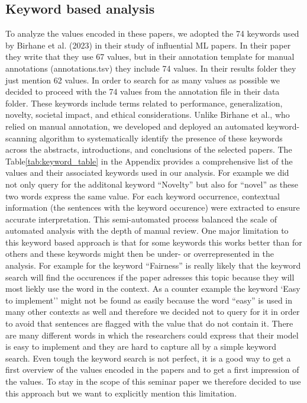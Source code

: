 \documentclass{article}
\begin{document}
\subsection{Keyword based analysis}
To analyze the values encoded in these papers, we adopted the 74 keywords used by Birhane et al. (2023) in their study of influential ML papers. In their paper
they write that they use 67 values, but in their annotation template for manual annotations (annotations.tsv) they include 74 values. In their results folder they
just mention 62 values. In order to search for as many values as possible we decided to proceed with the 74 values from the annotation file in their data folder.  
These keywords include terms related to performance, generalization, novelty, societal impact, and ethical considerations. 
Unlike Birhane et al., who relied on manual annotation, we developed and deployed an automated keyword-scanning algorithm to systematically identify the presence of 
these keywords across the abstracts, introductions, and conclusions of the selected papers.
The Table\ref{tab:keyword_table} in the Appendix provides a comprehensive list of the values and their associated keywords used in our analysis.
For example we did not only query for the additonal keyword ``Novelty'' but also for ``novel'' as these two
words express the same value. 
For each keyword occurrence, contextual information (the sentences with the keyword occurence) were extracted to ensure accurate interpretation. 
This semi-automated process balanced the scale of automated analysis with the depth of manual review. One major limitation to this keyword based approach is 
that for some keywords this works better than for others and these keywords might then be under- or overrepresented in the analysis. For example for the keyword ``Fairness'' is really likely that the 
keyword search will find the occurences if the paper adresses this topic because they will most liekly use the word in the context. 
As a counter example the keyword `Easy to implement'' might not be found as easily because the word ``easy'' is used in many other contexts as well and therefore we decided not to query for it in order to avoid that sentences are flagged with 
the value that do not contain it.
There are many different words in which the researchers could express that their model is easy to implement and they are hard to capture all by a simple keyword search.
Even tough the keyword search is not perfect, it is a good way to get a first overview of the values encoded in the papers and to get a first impression of the values. To stay in the scope of this seminar paper 
we therefore decided to use this approach but we want to explicitly mention this limitation.
\end{document}
